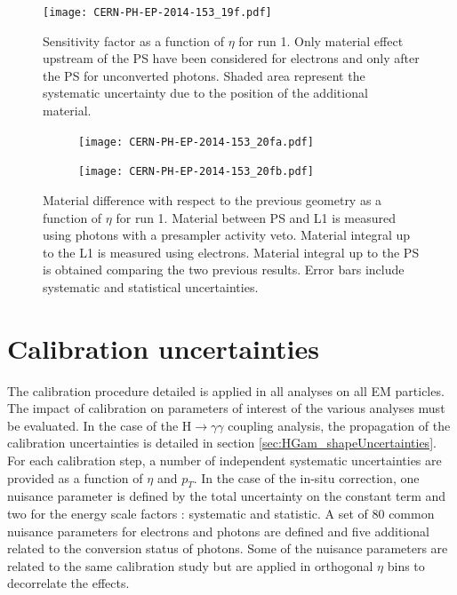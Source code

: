 \begin{figure}[htbp]
\centering
\texttt{[image: CERN-PH-EP-2014-153\_19f.pdf]}
\caption{\label{fig:orga1f93e3}
Sensitivity factor as a function of $\eta$ for run 1. Only material effect upstream of the PS have been considered for electrons and only after the PS for unconverted photons. Shaded area represent the systematic uncertainty due to the position of the additional material. \cite{CERN-PH-EP-2014-153}}
\end{figure}


\begin{figure}
\begin{subfigure}[t]{.49\linewidth}
\begin{center}
\texttt{[image: CERN-PH-EP-2014-153\_20fa.pdf]}
\end{center}
\end{subfigure}
\begin{subfigure}[t]{.49\linewidth}
\begin{center}
\texttt{[image: CERN-PH-EP-2014-153\_20fb.pdf]}
\end{center}
\end{subfigure}
\caption{\label{org696c32f}
Material difference with respect to the previous geometry as a function of $\eta$ for run 1. Material between PS and L1 is measured using photons with a presampler activity veto. Material integral up to the L1 is measured using electrons. Material integral up to the PS is obtained comparing the two previous results. Error bars include systematic and statistical uncertainties.\cite{CERN-PH-EP-2014-153}}
\end{figure}


\section{Calibration uncertainties}
\label{sec:org76028eb}
The calibration procedure detailed is applied in all analyses on all EM particles.
The impact of calibration on parameters of interest of the various analyses must be evaluated.
In the case of the H\(\rightarrow \gamma \gamma\) coupling analysis, the propagation of the calibration uncertainties is detailed in section \ref{sec:HGam_shapeUncertainties}.
For each calibration step, a number of independent systematic uncertainties are provided as a function of $\eta$ and $p_T$.
In the case of the in-situ correction, one nuisance parameter is defined by the total uncertainty on the constant term and two for the energy scale factors : systematic and statistic.
A set of 80 common nuisance parameters for electrons and photons are defined and five additional related to the conversion status of photons.
Some of the nuisance parameters are related to the same calibration study but are applied in orthogonal $\eta$ bins to decorrelate the effects.

